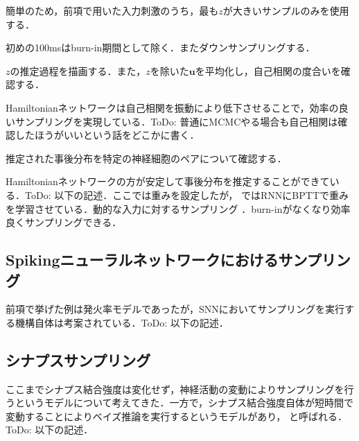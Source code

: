 簡単のため，前項で用いた入力刺激のうち，最も$z$が大きいサンプルのみを使用する．






初めの100msはburn-in期間として除く．またダウンサンプリングする．


$z$の推定過程を描画する．また，$z$を除いた$\mathbf{u}$を平均化し，自己相関の度合いを確認する．


Hamiltonianネットワークは自己相関を振動により低下させることで，効率の良いサンプリングを実現している．ToDo: 普通にMCMCやる場合も自己相関は確認したほうがいいという話をどこかに書く．

推定された事後分布を特定の神経細胞のペアについて確認する．



Hamiltonianネットワークの方が安定して事後分布を推定することができている．ToDo: 以下の記述．ここでは重みを設定したが， \cite{Echeveste2020-sh}ではRNNにBPTTで重みを学習させている．動的な入力に対するサンプリング \cite{Berkes2011-xj}．burn-inがなくなり効率良くサンプリングできる．
\subsection{Spikingニューラルネットワークにおけるサンプリング}
前項で挙げた例は発火率モデルであったが，SNNにおいてサンプリングを実行する機構自体は考案されている．ToDo: 以下の記述．\cite{Buesing2011-dm}\cite{Masset2022-wh}\cite{Zhang2022-bl}
\subsection{シナプスサンプリング}
ここまでシナプス結合強度は変化せず，神経活動の変動によりサンプリングを行うというモデルについて考えてきた．一方で，シナプス結合強度自体が短時間で変動することによりベイズ推論を実行するというモデルがあり，\textbf{} と呼ばれる．ToDo: 以下の記述．\cite{Kappel2015-kq}\cite{Aitchison2021-wo}
